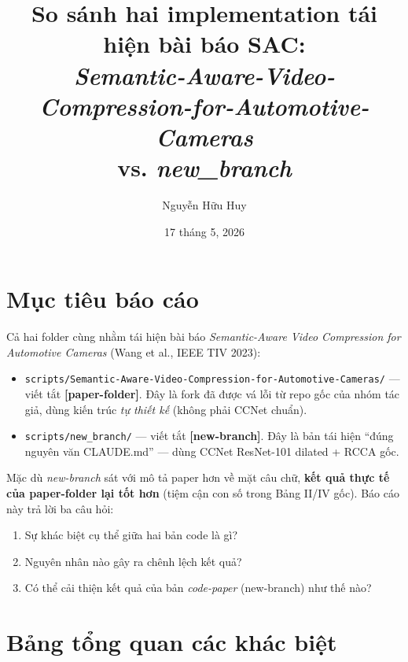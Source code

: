\documentclass[12pt,a4paper]{article}
\title{\textbf{So sánh hai implementation tái hiện bài báo SAC:\\
\emph{Semantic-Aware-Video-Compression-for-Automotive-Cameras}\\
\textbf{vs.} \emph{new\_branch}}}
\author{Nguyễn Hữu Huy}
\date{17 tháng 5, 2026}
\begin{document}
\maketitle

\section{Mục tiêu báo cáo}

Cả hai folder cùng nhằm tái hiện bài báo \emph{Semantic-Aware Video Compression for Automotive
Cameras} (Wang et al., IEEE TIV 2023):
\begin{itemize}[leftmargin=2em]
  \item \texttt{scripts/Semantic-Aware-Video-Compression-for-Automotive-Cameras/}
        — viết tắt \textbf{[paper-folder]}. Đây là fork đã được vá lỗi từ repo gốc của
        nhóm tác giả, dùng kiến trúc \emph{tự thiết kế} (không phải CCNet chuẩn).
  \item \texttt{scripts/new\_branch/} — viết tắt \textbf{[new-branch]}. Đây là bản tái
        hiện ``đúng nguyên văn CLAUDE.md'' — dùng CCNet ResNet-101 dilated + RCCA gốc.
\end{itemize}

Mặc dù \emph{new-branch} sát với mô tả paper hơn về mặt câu chữ, \textbf{kết quả thực
tế của paper-folder lại tốt hơn} (tiệm cận con số trong Bảng II/IV gốc). Báo cáo này
trả lời ba câu hỏi:
\begin{enumerate}[leftmargin=2em]
  \item Sự khác biệt cụ thể giữa hai bản code là gì?
  \item Nguyên nhân nào gây ra chênh lệch kết quả?
  \item Có thể cải thiện kết quả của bản \emph{code-paper} (new-branch) như thế nào?
\end{enumerate}

\section{Bảng tổng quan các khác biệt}
\end{document}
